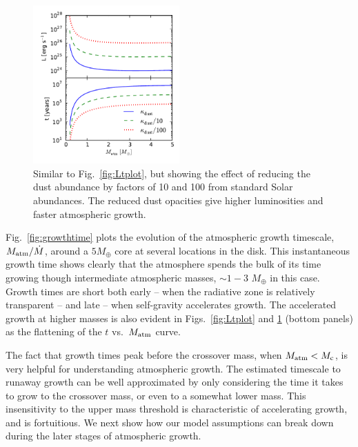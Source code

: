 \documentclass[apj, numberedappendix]{emulateapj}
\newcommand{\Fig}[1]{Fig.~\ref{#1}}
\newcommand{\Figs}[2]{Figs.~\ref{#1} and \ref{#2}}
\begin{document}
\begin{figure}[tb]
\centering
\includegraphics[width=0.5\textwidth]{../../figs/ModelAtmospheres/RadSelfGravPoly/PaperFigs/opacity_effect.pdf}
\caption{Similar to \Fig{fig:Ltplot}, but showing the effect of reducing the dust abundance by factors of 10 and 100 from standard Solar abundances. The reduced dust opacities give higher luminosities and faster atmospheric growth.}  %
\label{fig:LtvsMopacity}
\end{figure}

\Fig{fig:growthtime} plots the evolution of the atmospheric growth timescale, $M_{\rm atm}/\dot{M}$,  around a $5 M_{\oplus}$ core at several locations in the disk.  This instantaneous growth time shows clearly that the atmosphere spends the bulk of its time growing though intermediate atmospheric masses, $\sim 1 -3$ $M_\oplus$ in this case.  Growth times are short both early -- when the radiative zone is relatively transparent -- and late -- when self-gravity accelerates growth.  The accelerated growth at higher masses is also evident in \Figs{fig:Ltplot}{fig:LtvsMopacity} (bottom panels) as the flattening of the $t$ vs.\ $M_{\rm atm}$ curve.  

The fact that growth times peak before the crossover mass, when $M_{\rm{atm}} < M_{\rm c}$, is very helpful for understanding atmospheric growth.  The estimated timescale to runaway growth can be well approximated by only considering the time it takes to grow to the crossover mass, or even to a somewhat lower mass.  This insensitivity to the upper mass threshold is characteristic of accelerating growth, and is fortuitious.  We next show how our model assumptions can break down during the later stages of atmospheric growth.
\end{document}
